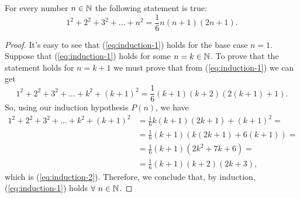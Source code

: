 \begin{example}
    For every number $n\in\mathbb{N}$ the following statement is true:
    \begin{equation}\label{eq:induction-1}
        1^2 + 2^2 + 3^2 + \ldots + n^2 = \frac{1}{6}n\left( n + 1 \right)\left( 2n+ 1 \right) .
    \end{equation}
    \begin{proof}
        It's easy to see that (\ref{eq:induction-1}) holds for the base case $n = 1$. Suppose that
        (\ref{eq:induction-1}) holds for some $n = k\in\mathbb{N}$. To prove that the statement holds for $n = k + 1$
        we must prove that from (\ref{eq:induction-1}) we can get
        \begin{equation}\label{eq:induction-2}
            1^2 + 2^2 + 3^2 + \ldots + k^2 + \left( k + 1 \right)^2  = \frac{1}{6}\left( k + 1 \right)\left( k + 2 \right) \left( 2\left( k + 1 \right) + 1 \right).
        \end{equation}
        So, using our induction hypothesis $P\left( n \right) $, we have
        \begin{align}
            1^2 + 2^2 + 3^2 + \ldots + k^2 + \left( k + 1 \right)^2 &= \frac{1}{6}k\left( k + 1 \right)
            \left( 2k + 1 \right) + \left( k + 1 \right)^2 = \\
                                                                    &= \frac{1}{6}\left( k + 1 \right)
                                                                    \left(k\left( 2k + 1 \right) + 6\left( k + 1 \right) \right) = \\
                                                                    &= \frac{1}{6}\left( k + 1 \right) \left( 2k^2 + 7k + 6 \right) = \\
                                                                    &= \frac{1}{6}\left( k + 1 \right)\left( k + 2 \right) \left( 2k + 3 \right),
        \end{align}
        which is (\ref{eq:induction-2}). Therefore, we conclude that, by induction, (\ref{eq:induction-1})
        holds $\forall\ n\in\mathbb{N}$.
    \end{proof}
\end{example}

